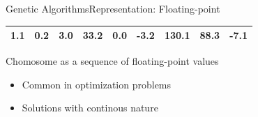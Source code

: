 \documentclass[10pt,compress]{beamer} %
\begin{document}
\begin{frame}{Genetic Algorithms}{Representation: Floating-point}
	\begin{table}[]
	\centering
	\begin{tabular}{|l|l|l|l|l|l|l|l|l|}
	\hline
 	1.1 & 0.2 & 3.0 & 33.2 & 0.0 & -3.2 & 130.1 & 88.3 & -7.1\\ \hline
	\end{tabular}
	\end{table}

	Chomosome as a sequence of floating-point values
	\begin{itemize}
		\item Common in optimization problems
		\item Solutions with continous nature
  	\end{itemize}
\end{frame}

\end{document}
